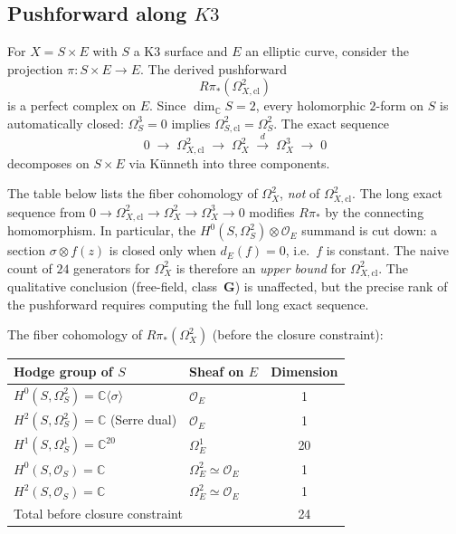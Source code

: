 \documentclass[11pt]{article}
\newcommand{\cO}{\mathcal{O}}
\newcommand{\C}{\mathbb{C}}
\begin{document}
\subsection{Pushforward along $K3$}
\label{subsec:pushforward-k3}

For $X = S \times E$ with $S$ a K3 surface and $E$ an elliptic curve, consider the projection $\pi \colon S \times E \to E$. The derived pushforward
\[
 R\pi_*(\Omega^2_{X,\mathrm{cl}})
\]
is a perfect complex on $E$. Since $\dim_\C S = 2$, every holomorphic $2$-form on $S$ is automatically closed: $\Omega^3_S = 0$ implies $\Omega^2_{S,\mathrm{cl}} = \Omega^2_S$. The exact sequence
\[
 0 \;\longrightarrow\; \Omega^2_{X,\mathrm{cl}} \;\longrightarrow\; \Omega^2_X \;\xrightarrow{\;d\;}\; \Omega^3_X \;\longrightarrow\; 0
\]
decomposes on $S \times E$ via K\"unneth into three components.

\begin{warning}
\label{warn:closure-condition}
The table below lists the fiber cohomology of $\Omega^2_X$, \emph{not} of $\Omega^2_{X,\mathrm{cl}}$. The long exact sequence from $0 \to \Omega^2_{X,\mathrm{cl}} \to \Omega^2_X \to \Omega^3_X \to 0$ modifies $R\pi_*$ by the connecting homomorphism. In particular, the $H^0(S, \Omega^2_S) \otimes \cO_E$ summand is cut down: a section $\sigma \otimes f(z)$ is closed only when $d_E(f) = 0$, i.e.\ $f$ is constant. The naive count of $24$ generators for $\Omega^2_X$ is therefore an \emph{upper bound} for $\Omega^2_{X,\mathrm{cl}}$. The qualitative conclusion (free-field, class~$\mathbf{G}$) is unaffected, but the precise rank of the pushforward requires computing the full long exact sequence.
\end{warning}

\noindent The fiber cohomology of $R\pi_*(\Omega^2_X)$ (before the closure constraint):

\begin{center}
\renewcommand{\arraystretch}{1.3}
\begin{tabular}{llc}
 \toprule
 \textbf{Hodge group of $S$} & \textbf{Sheaf on $E$} & \textbf{Dimension} \\
 \midrule
 $H^0(S, \Omega^2_S) = \C\langle\sigma\rangle$ & $\cO_E$ & 1 \\
 $H^2(S, \Omega^2_S) = \C$ (Serre dual) & $\cO_E$ & 1 \\
 $H^1(S, \Omega^1_S) = \C^{20}$ & $\Omega^1_E$ & 20 \\
 $H^0(S, \cO_S) = \C$ & $\Omega^2_E \simeq \cO_E$ & 1 \\
 $H^2(S, \cO_S) = \C$ & $\Omega^2_E \simeq \cO_E$ & 1 \\
 \midrule
 \multicolumn{2}{l}{Total before closure constraint} & 24 \\
 \bottomrule
\end{tabular}
\end{center}
\end{document}
